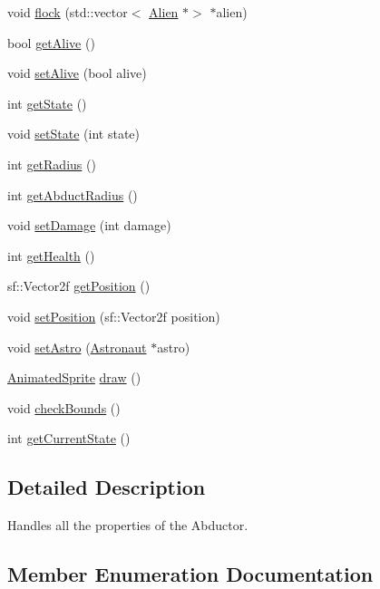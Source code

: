 \begin{DoxyCompactItemize}
\item 
void \hyperlink{class_alien_a087d886ecd8b70d2554bb54fae81528d}{flock} (std\+::vector$<$ \hyperlink{class_alien}{Alien} $\ast$$>$ $\ast$alien)
\item 
bool \hyperlink{class_alien_a6da0e947ec0c70d429e54511d67ad608}{get\+Alive} ()
\item 
void \hyperlink{class_alien_a1f8e8072e38c88e7299867ce08e169f4}{set\+Alive} (bool alive)
\item 
int \hyperlink{class_alien_a4954611d3a021f57a02564f17a3b0efc}{get\+State} ()
\item 
void \hyperlink{class_alien_aead215fe05108897f31e12c9e58b0d90}{set\+State} (int state)
\item 
int \hyperlink{class_alien_ab649dc3a1c86463c29b32931683685ab}{get\+Radius} ()
\item 
int \hyperlink{class_alien_a9dbe59b6c7ec7ad946e113f0f05f7427}{get\+Abduct\+Radius} ()
\item 
void \hyperlink{class_alien_a5f1364d7d592e43230971365bb58d5a3}{set\+Damage} (int damage)
\item 
int \hyperlink{class_alien_aa83dd26e21c40429865e3f84018545a0}{get\+Health} ()
\item 
sf\+::\+Vector2f \hyperlink{class_alien_a52dc07105cf8ff2a25961ecebf9fbbe1}{get\+Position} ()
\item 
void \hyperlink{class_alien_a751c54dcc0d77d92c6540b05b0fef50a}{set\+Position} (sf\+::\+Vector2f position)
\item 
void \hyperlink{class_alien_a23b7f6d84b71e233834a36ee37e90b14}{set\+Astro} (\hyperlink{class_astronaut}{Astronaut} $\ast$astro)
\item 
\hyperlink{class_animated_sprite}{Animated\+Sprite} \hyperlink{class_alien_a518e51803e638c46d0452ba283f2aad6}{draw} ()
\item 
void \hyperlink{class_alien_a1f94914265a34170958fbf0cc4dbf187}{check\+Bounds} ()
\item 
int \hyperlink{class_alien_a3165f3c2c824c3784dd0054d48fd5c5a}{get\+Current\+State} ()
\end{DoxyCompactItemize}


\subsection{Detailed Description}
Handles all the properties of the Abductor. 



\subsection{Member Enumeration Documentation}
\mbox{\label{class_alien_a46333b42b6e6dff962c3236b7012ec8c}} 
